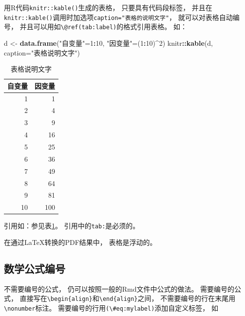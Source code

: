 \documentclass[
]{article}
\newenvironment{Shaded}{\begin{snugshade}}{\end{snugshade}}
\newcommand{\AttributeTok}[1]{\textcolor[rgb]{0.13,0.29,0.53}{#1}}
\newcommand{\DecValTok}[1]{\textcolor[rgb]{0.00,0.00,0.81}{#1}}
\newcommand{\FunctionTok}[1]{\textcolor[rgb]{0.13,0.29,0.53}{\textbf{#1}}}
\newcommand{\NormalTok}[1]{#1}
\newcommand{\OtherTok}[1]{\textcolor[rgb]{0.56,0.35,0.01}{#1}}
\newcommand{\SpecialCharTok}[1]{\textcolor[rgb]{0.81,0.36,0.00}{\textbf{#1}}}
\newcommand{\StringTok}[1]{\textcolor[rgb]{0.31,0.60,0.02}{#1}}
\begin{document}
用R代码\texttt{knitr::kable()}生成的表格，
只要具有代码段标签，
并且在\texttt{knitr::kable()}调用时加选项\texttt{caption="表格的说明文字"}，
就可以对表格自动编号，
并且可以用如\texttt{\textbackslash{}@ref(tab:label)}的格式引用表格。
如：

\begin{Shaded}
\begin{Highlighting}[]
\NormalTok{d }\OtherTok{\textless{}{-}} \FunctionTok{data.frame}\NormalTok{(}\StringTok{"自变量"}\OtherTok{=}\DecValTok{1}\SpecialCharTok{:}\DecValTok{10}\NormalTok{, }\StringTok{"因变量"}\OtherTok{=}\NormalTok{(}\DecValTok{1}\SpecialCharTok{:}\DecValTok{10}\NormalTok{)}\SpecialCharTok{\^{}}\DecValTok{2}\NormalTok{)}
\NormalTok{knitr}\SpecialCharTok{::}\FunctionTok{kable}\NormalTok{(d, }\AttributeTok{caption=}\StringTok{"表格说明文字"}\NormalTok{)}
\end{Highlighting}
\end{Shaded}

\begin{table}

\caption{\label{tab:u-w-tab-ex01}表格说明文字}
\centering
\begin{tabular}[t]{r|r}
\hline
自变量 & 因变量\\
\hline
1 & 1\\
\hline
2 & 4\\
\hline
3 & 9\\
\hline
4 & 16\\
\hline
5 & 25\\
\hline
6 & 36\\
\hline
7 & 49\\
\hline
8 & 64\\
\hline
9 & 81\\
\hline
10 & 100\\
\hline
\end{tabular}
\end{table}

引用如：参见表\ref{tab:u-w-tab-ex01}。
引用中的\texttt{tab:}是必须的。

在通过LaTeX转换的PDF结果中，
表格是浮动的。

\subsection{数学公式编号}\label{usage-writing-math}

不需要编号的公式，
仍可以按照一般的Rmd文件中公式的做法。
需要编号的公式，
直接写在\texttt{\textbackslash{}begin\{align\}}和\texttt{\textbackslash{}end\{align\}}之间，
不需要编号的行在末尾用\texttt{\textbackslash{}nonumber}标注。
需要编号的行用\texttt{(\textbackslash{}\#eq:mylabel)}添加自定义标签，
如
\end{document}
